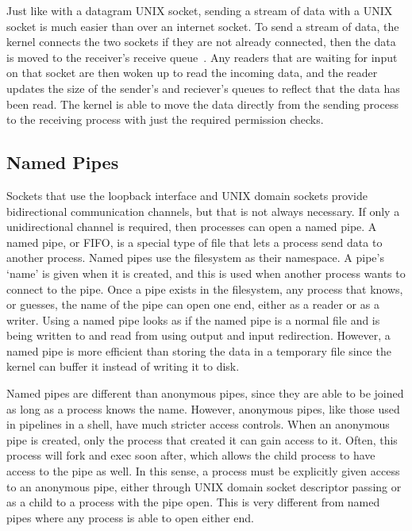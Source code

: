 Just like with a datagram UNIX socket, sending a stream of data with a UNIX socket is much easier than over an internet socket.  To send a stream of data, the kernel connects the two sockets if they are not already connected, then the data is moved to the receiver's receive queue~\cite[265--268]{Stevens:1996:TIT:233130}.  Any readers that are waiting for input on that socket are then woken up to read the incoming data, and the reader updates the size of the sender's and reciever's queues to reflect that the data has been read.  The kernel is able to move the data directly from the sending process to the receiving process with just the required permission checks.

\subsection{Named Pipes}
\label{sec:namedPipes}
Sockets that use the loopback interface and UNIX domain sockets provide bidirectional communication channels, but that is not always necessary.  If only a unidirectional channel is required, then processes can open a named pipe.  A named pipe, or FIFO, is a special type of file that lets a process send data to another process.  Named pipes use the filesystem as their namespace.  A pipe's `name' is given when it is created, and this is used when another process wants to connect to the pipe.  Once a pipe exists in the filesystem, any process that knows, or guesses, the name of the pipe can open one end, either as a reader or as a writer.  Using a named pipe looks as if the named pipe is a normal file and is being written to and read from using output and input redirection.  However, a named pipe is more efficient than storing the data in a temporary file since the kernel can buffer it instead of writing it to disk.

Named pipes are different than anonymous pipes, since they are able to be joined as long as a process knows the name.  However, anonymous pipes, like those used in pipelines in a shell, have much stricter access controls.  When an anonymous pipe is created, only the process that created it can gain access to it.  Often, this process will fork and exec soon after, which allows the child process to have access to the pipe as well.  In this sense, a process must be explicitly given access to an anonymous pipe, either through UNIX domain socket descriptor passing or as a child to a process with the pipe open.  This is very different from named pipes where any process is able to open either end.

